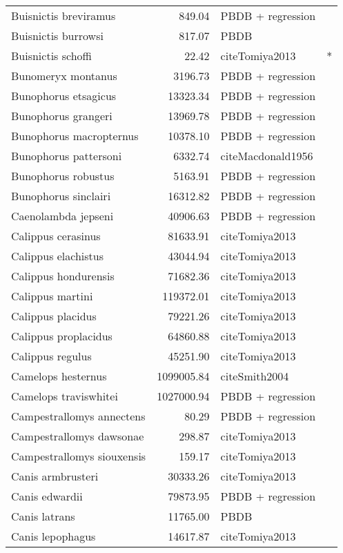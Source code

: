 \begin{table}[ht]
\begin{tabular}{lrll}
  Buisnictis breviramus & 849.04 & PBDB + regression &  \\ 
  Buisnictis burrowsi & 817.07 & PBDB &  \\ 
  Buisnictis schoffi & 22.42 & cite{Tomiya2013} & * \\ 
  Bunomeryx montanus & 3196.73 & PBDB + regression &  \\ 
  Bunophorus etsagicus & 13323.34 & PBDB + regression &  \\ 
  Bunophorus grangeri & 13969.78 & PBDB + regression &  \\ 
  Bunophorus macropternus & 10378.10 & PBDB + regression &  \\ 
  Bunophorus pattersoni & 6332.74 & cite{Macdonald1956} &  \\ 
  Bunophorus robustus & 5163.91 & PBDB + regression &  \\ 
  Bunophorus sinclairi & 16312.82 & PBDB + regression &  \\ 
  Caenolambda jepseni & 40906.63 & PBDB + regression &  \\ 
  Calippus cerasinus & 81633.91 & cite{Tomiya2013} &  \\ 
  Calippus elachistus & 43044.94 & cite{Tomiya2013} &  \\ 
  Calippus hondurensis & 71682.36 & cite{Tomiya2013} &  \\ 
  Calippus martini & 119372.01 & cite{Tomiya2013} &  \\ 
  Calippus placidus & 79221.26 & cite{Tomiya2013} &  \\ 
  Calippus proplacidus & 64860.88 & cite{Tomiya2013} &  \\ 
  Calippus regulus & 45251.90 & cite{Tomiya2013} &  \\ 
  Camelops hesternus & 1099005.84 & cite{Smith2004} &  \\ 
  Camelops traviswhitei & 1027000.94 & PBDB + regression &  \\ 
  Campestrallomys annectens & 80.29 & PBDB + regression &  \\ 
  Campestrallomys dawsonae & 298.87 & cite{Tomiya2013} &  \\ 
  Campestrallomys siouxensis & 159.17 & cite{Tomiya2013} &  \\ 
  Canis armbrusteri & 30333.26 & cite{Tomiya2013} &  \\ 
  Canis edwardii & 79873.95 & PBDB + regression &  \\ 
  Canis latrans & 11765.00 & PBDB &  \\ 
  Canis lepophagus & 14617.87 & cite{Tomiya2013} &  \\ 

\end{tabular}
\end{table}
